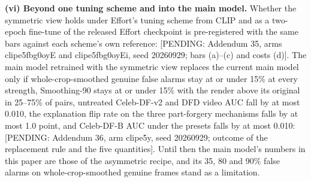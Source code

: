 \textbf{(vi) Beyond one tuning scheme and into the main model.} Whether the symmetric view holds under Effort's tuning
scheme from CLIP and as a two-epoch fine-tune of the released Effort checkpoint is pre-registered with the same bars
against each scheme's own reference: [PENDING: Addendum 35, arms clipe5fbg0oyE and clipe5fbg0oyEi, seed 20260929; bars
(a)--(c) and costs (d)]. The main model retrained with the symmetric view replaces the current main model only if
whole-crop-smoothed genuine false alarms stay at or under 15\% at every strength, Smoothing-90 stays at or under 15\%
with the render above its original in 25--75\% of pairs, untreated Celeb-DF-v2 and DFD video AUC fall by at most 0.010,
the explanation flip rate on the three part-forgery mechanisms falls by at most 1.0 point, and Celeb-DF-B AUC under the
presets falls by at most 0.010: [PENDING: Addendum 36, arm clipe5y, seed 20260929; outcome of the replacement rule and
the five quantities]. Until then the main model's numbers in this paper are those of the asymmetric recipe, and its
35, 80 and 90\% false alarms on whole-crop-smoothed genuine frames stand as a limitation.
